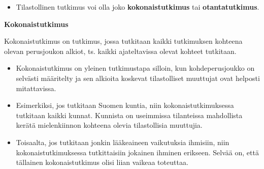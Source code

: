 \documentclass[
]{book}
\providecommand{\tightlist}{%
  \setlength{\itemsep}{0pt}\setlength{\parskip}{0pt}}
\begin{document}
\begin{itemize}
\tightlist
\item
  Tilastollinen tutkimus voi olla joko \textbf{kokonaistutkimus} tai \textbf{otantatutkimus}.
\end{itemize}

\begin{defblock}{}

\textbf{Kokonaistutkimus}

Kokonaistutkimus on tutkimus, jossa tutkitaan kaikki tutkimuksen kohteena olevan perusjoukon alkiot, ts. kaikki ajateltavissa olevat kohteet tutkitaan.

\begin{itemize}
\tightlist
\item
  Kokonaistutkimus on yleinen tutkimustapa silloin, kun kohdeperusjoukko on selvästi määritelty ja sen alkioita koskevat tilastolliset muuttujat ovat helposti mitattavissa.
\item
  Esimerkiksi, jos tutkitaan Suomen kuntia, niin kokonaistutkimuksessa tutkitaan kaikki kunnat. Kunnista on useimmissa tilanteissa mahdollista kerätä mielenkiinnon kohteena olevia tilastollisia muuttujia.
\item
  Toisaalta, jos tutkitaan jonkin lääkeaineen vaikutuksia ihmisiin, niin kokonaistutkimuksessa tutkittaisiin jokainen ihminen erikseen. Selvää on, että tällainen kokonaistutkimus olisi liian vaikeaa toteuttaa.
\end{itemize}

\end{defblock}
\end{document}

